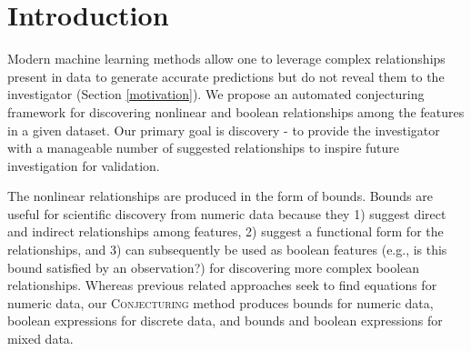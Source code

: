 \documentclass[ijds,nonblindrev]{informs-ijds}
\begin{document}
%


   \HISTORY{} 

\maketitle


\section{Introduction}
Modern machine learning methods allow one to leverage complex relationships present in data to generate accurate predictions but do not reveal them to the investigator (Section \ref{motivation}).  We propose an automated conjecturing framework for discovering nonlinear and boolean relationships among the features in a given dataset.  Our primary goal is discovery - to provide the investigator with a manageable number of suggested relationships to inspire future investigation for validation.

The nonlinear relationships are produced in the form of bounds.  Bounds are useful for scientific discovery from numeric data because they 1) suggest direct and indirect relationships among features, 2) suggest a functional form for the relationships, and 3) can subsequently be used as boolean features (e.g., is this bound satisfied by an observation?) for discovering more complex boolean relationships.  Whereas previous related approaches seek to find equations for numeric data, our \textsc{Conjecturing} method produces bounds for numeric data, boolean expressions for discrete data, and bounds and boolean expressions for mixed data.
\end{document}
